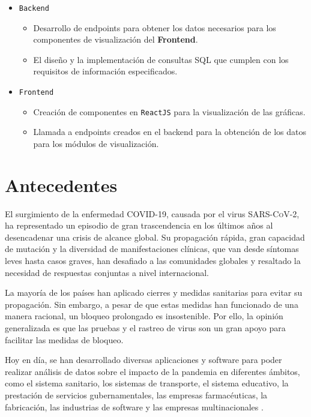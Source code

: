 \begin{itemize}
    \item \texttt{Backend}
        \begin{itemize}
            \item Desarrollo de endpoints para obtener los datos necesarios para los componentes de visualización del \textbf{Frontend}.
            \item El diseño y la implementación de consultas SQL que cumplen con los requisitos de información especificados.
        \end{itemize}
    \item \texttt{Frontend}
        \begin{itemize}
            \item Creación de componentes en \texttt{ReactJS} para la visualización de las gráficas.

            \item Llamada a endpoints creados en el backend para la obtención de los datos para los módulos de visualización.
        \end{itemize}
    
\end{itemize}

\section{Antecedentes}\label{hipótesis}


El surgimiento de la enfermedad \textsc{COVID-19}, causada por el virus \textsc{SARS-CoV-2}, ha representado un episodio de gran trascendencia en los últimos años al desencadenar una crisis de alcance global. Su propagación rápida, gran capacidad de mutación y la diversidad de manifestaciones clínicas, que van desde síntomas leves hasta casos graves, han desafiado a las comunidades globales y resaltado la necesidad de respuestas conjuntas a nivel internacional.

La mayoría de los países han aplicado cierres y medidas sanitarias para evitar su propagación. Sin embargo, a pesar de que estas medidas han funcionado de una manera racional, un bloqueo prolongado es insostenible. Por ello, la opinión generalizada es que las pruebas y el rastreo de virus son un gran apoyo para facilitar las medidas de bloqueo.

Hoy en día, se han desarrollado diversas aplicaciones y software para poder realizar análisis de datos sobre el impacto de la pandemia en diferentes ámbitos, como el sistema sanitario, los sistemas de transporte, el sistema educativo, la prestación de servicios gubernamentales, las empresas farmacéuticas, la fabricación, las industrias de software y las empresas multinacionales \cite{ayaad2019role} \cite{delrosario2021procesamiento}.

